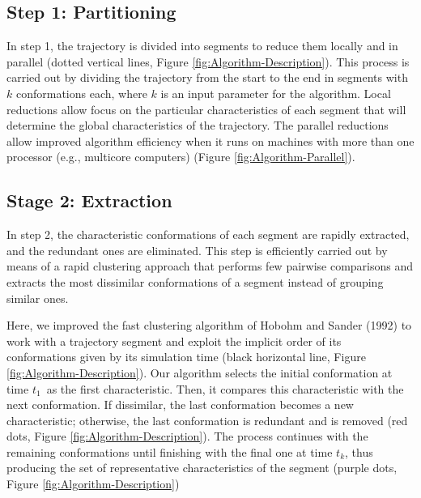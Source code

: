 \documentclass[twocolumn]{bmcart}%
\begin{document}
\subsection*{Step 1: Partitioning}

In step 1, the trajectory is divided into segments to reduce them locally and in parallel (dotted vertical lines, Figure \ref{fig:Algorithm-Description}). This process is carried out by dividing the trajectory from the start to the end in segments with $k$ conformations each, where $k$ is an input parameter for the algorithm. Local reductions allow focus on the particular characteristics of each segment that will determine the global characteristics of the trajectory. The parallel reductions allow improved algorithm efficiency when it runs on machines with more than one processor (e.g., multicore computers) (Figure \ref{fig:Algorithm-Parallel}).



\subsection*{Stage 2: Extraction}

In step 2, the characteristic conformations of each segment are rapidly extracted, and the redundant ones are eliminated. This step is efficiently carried out by means of a rapid clustering approach that performs few pairwise comparisons and extracts the most dissimilar conformations of a segment instead of grouping similar ones.

Here, we improved the fast clustering algorithm of Hobohm and Sander (1992) to work with a trajectory segment and exploit the implicit order of its conformations given by its simulation time (black horizontal line, Figure \ref{fig:Algorithm-Description}). Our algorithm selects the initial conformation at time $t_{1}$~as the first characteristic. Then, it compares this characteristic with the next conformation. If dissimilar, the last conformation becomes a new characteristic; otherwise, the last conformation is redundant and is removed (red dots, Figure \ref{fig:Algorithm-Description}). The process continues with the remaining conformations until finishing with the final one at time $t_{k}$, thus producing the set of representative characteristics of the segment (purple dots, Figure \ref{fig:Algorithm-Description})
\end{document}
